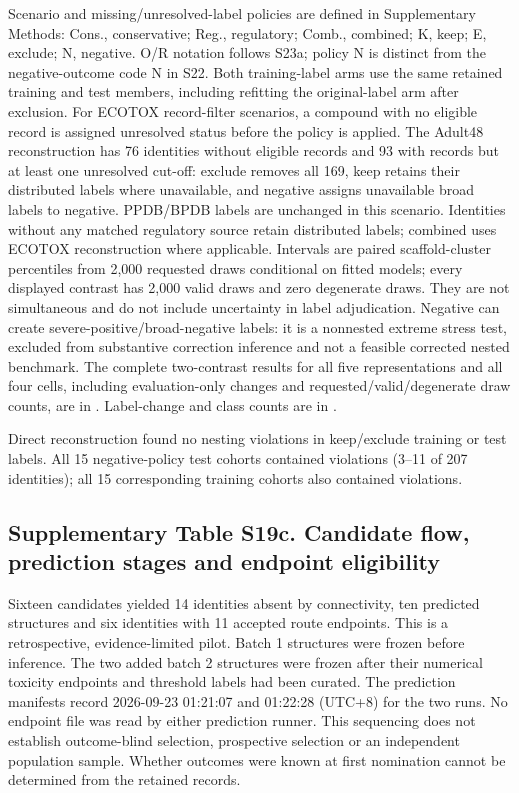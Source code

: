 Scenario and missing/unresolved-label policies are defined in Supplementary Methods: Cons., conservative; Reg., regulatory; Comb., combined; K, keep; E, exclude; N, negative. O/R notation follows S23a; policy N is distinct from the negative-outcome code N in S22. Both training-label arms use the same retained training and test members, including refitting the original-label arm after exclusion. For ECOTOX record-filter scenarios, a compound with no eligible record is assigned unresolved status before the policy is applied. The Adult48 reconstruction has 76 identities without eligible records and 93 with records but at least one unresolved cut-off: exclude removes all 169, keep retains their distributed labels where unavailable, and negative assigns unavailable broad labels to negative. PPDB/BPDB labels are unchanged in this scenario. Identities without any matched regulatory source retain distributed labels; combined uses ECOTOX reconstruction where applicable. Intervals are paired scaffold-cluster percentiles from 2,000 requested draws conditional on fitted models; every displayed contrast has 2,000 valid draws and zero degenerate draws. They are not simultaneous and do not include uncertainty in label adjudication. Negative can create severe-positive/broad-negative labels: it is a nonnested extreme stress test, excluded from substantive correction inference and not a feasible corrected nested benchmark. The complete two-contrast results for all five representations and all four cells, including evaluation-only changes and requested/valid/degenerate draw counts, are in . Label-change and class counts are in .

Direct reconstruction found no nesting violations in keep/exclude training or test labels. All 15 negative-policy test cohorts contained violations (3--11 of 207 identities); all 15 corresponding training cohorts also contained violations.

\subsection*{Supplementary Table S19c. Candidate flow, prediction stages and endpoint eligibility}

Sixteen candidates yielded 14 identities absent by connectivity, ten predicted structures and six identities with 11 accepted route endpoints. This is a retrospective, evidence-limited pilot. Batch 1 structures were frozen before inference. The two added batch 2 structures were frozen after their numerical toxicity endpoints and threshold labels had been curated. The prediction manifests record 2026-09-23 01:21:07 and 01:22:28 (UTC+8) for the two runs. No endpoint file was read by either prediction runner. This sequencing does not establish outcome-blind selection, prospective selection or an independent population sample. Whether outcomes were known at first nomination cannot be determined from the retained records.

